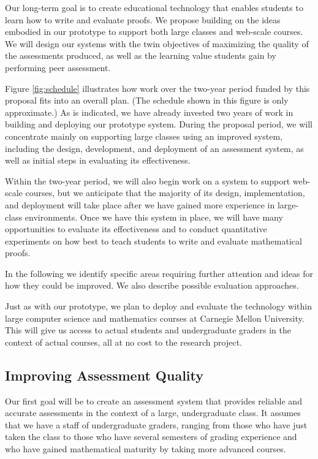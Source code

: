 \documentclass[12pt]{article}
\begin{document}
Our long-term goal is to create educational technology that enables
students to learn how to write and evaluate proofs.  We propose
building on the ideas embodied in our prototype to support both large
classes and web-scale courses.  We will design our systems with the
twin objectives of maximizing the quality of the assessments produced, as
well as the learning value students gain by performing peer assessment.

Figure \ref{fig:schedule} illustrates how work over the two-year
period funded by this proposal fits into an overall plan.  (The
schedule shown in this figure is only approximate.)  As is indicated,
we have already invested two years of work in building and deploying
our prototype system.  During the proposal period, we will concentrate
mainly on supporting large classes using an improved system, including
the design, development, and deployment of an assessment system,
as well as initial steps in evaluating its
effectiveness.

Within the two-year period,
we will also begin work on a system to support
web-scale courses, but we anticipate that the majority of its design,
implementation, and deployment will take place after we
have gained more experience in large-class environments.  Once we have
this system in place, we will have many opportunities to evaluate its
effectiveness and to conduct quantitative experiments on how best to
teach students to write and evaluate mathematical proofs.

In the following we identify specific areas requiring further
attention and ideas for how they could be improved.  We also describe
possible evaluation approaches.

Just as with our prototype, we plan to deploy and evaluate
the technology within large computer science and
mathematics courses at Carnegie Mellon University.  This will give us
access to actual students and undergraduate graders in the context of
actual courses, all at no cost to the research project.

\subsection{Improving Assessment Quality}

Our first goal will be to create an assessment system that provides
reliable and accurate assessments in the context of a large,
undergraduate class.  It assumes that we have a staff of undergraduate
graders, ranging from those who have just taken the class to those who
have several semesters of grading experience and who have gained
mathematical maturity by taking more advanced courses.
\end{document}
